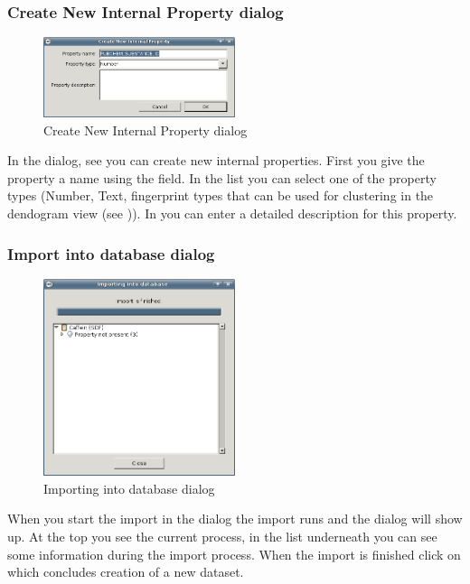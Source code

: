 \subsubsection{Create New Internal Property dialog}
\label{subsubsec:importing_data_create_property}
\begin{figure}[ht]
   \centering
   \includegraphics[width=0.5\textwidth]{images/import/create_property_empty.png}
   \caption{Create New Internal Property dialog}
   \label{fig:create_property_empty}
\end{figure}
In the  dialog, see
 you can create new internal properties. First
you give the property a name using the  field. In the
 list you can select one of the property types (Number, Text, fingerprint types that can be used for clustering in the dendogram view (see )). In  you can enter a
detailed description for this property.

\subsubsection{Import into database dialog}
\begin{figure}[ht]
   \centering
   \includegraphics[width=0.5\textwidth]{images/import/import_process_finished.png}
   \caption{Importing into database dialog}
   \label{fig:import_process_finished}
\end{figure}
When you start the import in the  dialog the import
runs and the  dialog will show up. At the top you see the
current process, in the list underneath you can see some information during the
import process. When the import is finished click on  which concludes
creation of a new dataset.

